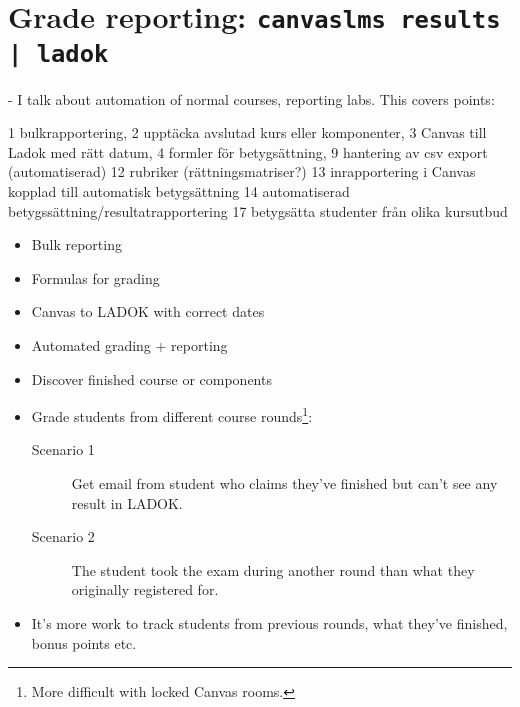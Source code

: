 \section[Grade reporting]{Grade reporting: \texttt{canvaslms results | ladok}}

- I talk about automation of normal courses, reporting labs. This covers  
points:

    1 bulkrapportering,
    2 upptäcka avslutad kurs eller komponenter,
    3 Canvas till Ladok med rätt datum,
    4 formler för betygsättning,
    9 hantering av csv export (automatiserad)
    12 rubriker (rättningsmatriser?)
    13 inrapportering i Canvas kopplad till automatisk betygsättning
    14 automatiserad betygssättning/resultatrapportering
    17 betygsätta studenter från olika kursutbud

\begin{frame}[fragile]
  \begin{example}[Reporting]
    \begin{itemize}
      \item \alert{Bulk reporting}
      \item \alert{Formulas for grading}
      \item \alert{Canvas to LADOK with correct dates}
      \item \alert{Automated grading + reporting}
    \end{itemize}
  \end{example}
\end{frame}

\begin{frame}
  \begin{example}
    \begin{itemize}
      \item \alert{Discover finished course or components}
      \item \alert{Grade students from different course rounds}\footnote{%
          More difficult with locked Canvas rooms.
        }:
        \begin{description}
          \item[Scenario 1] \alert{Get email from student who claims they've 
            finished but can't see any result in LADOK.}

          \item[Scenario 2] The student took the exam during another round than 
            what they originally registered for.
        \end{description}

      \item \alert{It's more work to track students from previous rounds, what 
        they've finished, bonus points etc.}
    \end{itemize}
  \end{example}
\end{frame}

